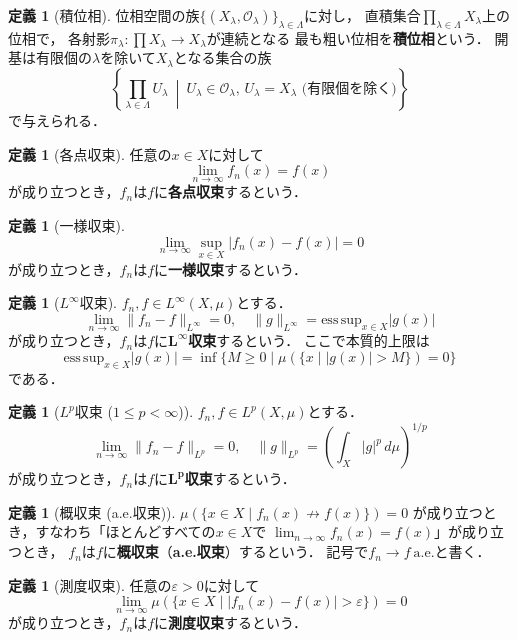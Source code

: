 \documentclass[dvipdfmx,a4paper,12pt]{jsarticle}
\theoremstyle{definition}
\newtheorem{definition}[theorem]{定義}
\begin{document}
\begin{definition}[積位相]
    位相空間の族$\{(X_\lambda,\mathcal{O}_\lambda)\}_{\lambda\in\Lambda}$に対し，
    直積集合$\prod_{\lambda\in\Lambda}X_\lambda$上の位相で，
    各射影$\pi_\lambda\colon\prod X_\lambda\to X_\lambda$が連続となる
    最も粗い位相を\textbf{積位相}という．
    開基は有限個の$\lambda$を除いて$X_\lambda$となる集合の族
    $$\left\{\prod_{\lambda\in\Lambda}U_\lambda\ \middle|\
    U_\lambda\in\mathcal{O}_\lambda,\,
    U_\lambda=X_\lambda \text{ (有限個を除く)}\right\}$$
    で与えられる．
\end{definition}

\begin{definition}[各点収束]
    任意の$x\in X$に対して
    $$\lim_{n\to\infty}f_n(x)=f(x)$$
    が成り立つとき，$f_n$は$f$に\textbf{各点収束}するという．
\end{definition}

\begin{definition}[一様収束]
    $$\lim_{n\to\infty}\sup_{x\in X}|f_n(x)-f(x)|=0$$
    が成り立つとき，$f_n$は$f$に\textbf{一様収束}するという．
\end{definition}

\begin{definition}[$L^\infty$収束]
    $f_n,f\in L^\infty(X,\mu)$とする．
    $$\lim_{n\to\infty}\|f_n-f\|_{L^\infty}=0,
    \quad \|g\|_{L^\infty}=\mathrm{ess\,sup}_{x\in X}|g(x)|$$
    が成り立つとき，$f_n$は$f$に$\bm{L^\infty}$\textbf{収束}するという．
    ここで本質的上限は
    $$\mathrm{ess\,sup}_{x\in X}|g(x)|
    =\inf\{M\geq 0\mid \mu(\{x\mid |g(x)|>M\})=0\}$$
    である．
\end{definition}

\begin{definition}[$L^p$収束 ($1\leq p<\infty$)]
    $f_n,f\in L^p(X,\mu)$とする．
    $$\lim_{n\to\infty}\|f_n-f\|_{L^p}=0,
    \quad \|g\|_{L^p}=\left(\int_X|g|^p\,d\mu\right)^{1/p}$$
    が成り立つとき，$f_n$は$f$に$\bm{L^p}$\textbf{収束}するという．
\end{definition}

\begin{definition}[概収束 (a.e.収束)]
    $\mu(\{x\in X\mid f_n(x)\not\to f(x)\})=0$
    が成り立つとき，すなわち「ほとんどすべての$x\in X$で
    $\lim_{n\to\infty}f_n(x)=f(x)$」が成り立つとき，
    $f_n$は$f$に\textbf{概収束}（\textbf{a.e.収束}）するという．
    記号で$f_n\to f\ \text{a.e.}$と書く．
\end{definition}

\begin{definition}[測度収束]
    任意の$\varepsilon>0$に対して
    $$\lim_{n\to\infty}\mu(\{x\in X\mid |f_n(x)-f(x)|>\varepsilon\})=0$$
    が成り立つとき，$f_n$は$f$に\textbf{測度収束}するという．
\end{definition}
\end{document}
